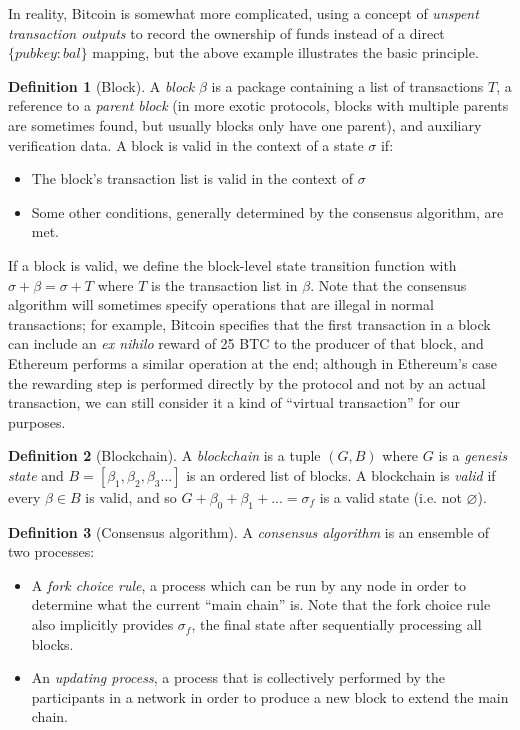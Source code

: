 \documentclass[11pt,a4paper]{article}
\makeatletter
\theoremstyle{plain}
\theoremstyle{definition}
\newtheorem{defn}{Definition}[section]
\theoremstyle{remark}
\newcommand{\ie}{i.e.\@\xspace}
\makeatother
\begin{document}
In reality, Bitcoin is somewhat more complicated, using a concept of \emph{unspent transaction outputs} to record the ownership of funds instead of a direct $\{pubkey: bal\}$ mapping, but the above example illustrates the basic principle.

\begin{defn}[Block]
A \emph{block} $\beta$ is a package containing a list of transactions $T$, a reference to a \emph{parent block} (in more exotic protocols, blocks with multiple parents are sometimes found, but usually blocks only have one parent), and auxiliary verification data. A block is valid in the context of a state $\sigma$ if:
\begin{itemize}
\item
The block's transaction list is valid in the context of $\sigma$
\item
Some other conditions, generally determined by the consensus algorithm, are met.
\end{itemize}
If a block is valid, we define the block-level state transition function with $\sigma + \beta = \sigma + T$ where $T$ is the transaction list in $\beta$. Note that the consensus algorithm will sometimes specify operations that are illegal in normal transactions; for example, Bitcoin specifies that the first transaction in a block can include an \emph{ex nihilo} reward of 25 BTC to the producer of that block, and Ethereum performs a similar operation at the end; although in Ethereum's case the rewarding step is performed directly by the protocol and not by an actual transaction, we can still consider it a kind of ``virtual transaction'' for our purposes.
\end{defn}

\begin{defn}[Blockchain]
A \emph{blockchain} is a tuple $(G, B)$ where $G$ is a \emph{genesis state} and $B = [\beta_1, \beta_2, \beta_3 ...]$ is an ordered list of blocks. A blockchain is \emph{valid} if every $\beta \in B$ is valid, and so $G + \beta_0 + \beta_1 + ... = \sigma_f$ is a valid state (\ie not $\varnothing$).
\end{defn}

\begin{defn}[Consensus algorithm]
A \emph{consensus algorithm} is an ensemble of two processes:
\begin{itemize}
\item
A \emph{fork choice rule}, a process which can be run by any node in order to determine what the current ``main chain'' is. Note that the fork choice rule also implicitly provides $\sigma_f$, the final state after sequentially processing all blocks.
\item
An \emph{updating process}, a process that is collectively performed by the participants in a network in order to produce a new block to extend the main chain.
\end{itemize}
\end{defn}
\end{document}
